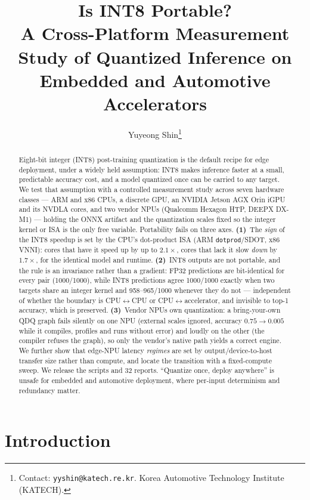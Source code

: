 \documentclass[11pt]{article}
\title{Is INT8 Portable?\\[2pt]
\large A Cross-Platform Measurement Study of Quantized Inference on Embedded and Automotive Accelerators}
\author{Yuyeong Shin\thanks{Contact: \texttt{yyshin@katech.re.kr}. Korea Automotive Technology Institute (KATECH).}}
\date{}
\begin{document}
\maketitle

\begin{abstract}
Eight-bit integer (INT8) post-training quantization is the default recipe for edge deployment, under a widely held assumption: INT8 makes inference faster at a small, predictable accuracy cost, and a model quantized once can be carried to any target. We test that assumption with a controlled measurement study across seven hardware classes --- ARM and x86 CPUs, a discrete GPU, an NVIDIA Jetson AGX Orin iGPU and its NVDLA cores, and two vendor NPUs (Qualcomm Hexagon HTP, DEEPX DX-M1) --- holding the ONNX artifact and the quantization scales fixed so the integer kernel or ISA is the only free variable. Portability fails on three axes. \textbf{(1)}~The \emph{sign} of the INT8 speedup is set by the CPU's dot-product ISA (ARM \texttt{dotprod}/SDOT, x86 VNNI): cores that have it speed up by up to $2.1\times$, cores that lack it slow \emph{down} by $1.7\times$, for the identical model and runtime. \textbf{(2)}~INT8 outputs are not portable, and the rule is an invariance rather than a gradient: FP32 predictions are bit-identical for every pair (1000/1000), while INT8 predictions agree 1000/1000 exactly when two targets share an integer kernel and 958--965/1000 whenever they do not --- independent of whether the boundary is CPU$\leftrightarrow$CPU or CPU$\leftrightarrow$accelerator, and invisible to top-1 accuracy, which is preserved. \textbf{(3)}~Vendor NPUs own quantization: a bring-your-own QDQ graph fails silently on one NPU (external scales ignored, accuracy $0.75 \rightarrow 0.005$ while it compiles, profiles and runs without error) and loudly on the other (the compiler refuses the graph), so only the vendor's native path yields a correct engine. We further show that edge-NPU latency \emph{regimes} are set by output/device-to-host transfer size rather than compute, and locate the transition with a fixed-compute sweep. We release the scripts and 32 reports. ``Quantize once, deploy anywhere'' is unsafe for embedded and automotive deployment, where per-input determinism and redundancy matter.
\end{abstract}

\section{Introduction}
\end{document}
